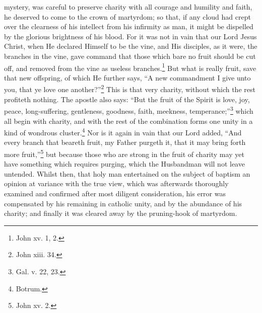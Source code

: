 mystery, was careful to preserve charity with all courage and humility and faith, he deserved to come to the crown of martyrdom; so that, if any cloud had crept over the clearness of his intellect from his infirmity as man, it might be dispelled by the glorious brightness of his blood. For it was not in vain that our Lord Jesus Christ, when He declared Himself to be the vine, and His disciples, as it were, the branches in the vine, gave command that those which bare no fruit should be cut off, and removed from the vine as useless branches.\footnote{\par  John xv. 1, 2.} But what is really fruit, save that new offspring, of which He further says, ``A new commandment I give unto you, that ye love one another?''\footnote{\par  John xiii. 34.} This is that very charity, without which the rest profiteth nothing. The apostle also says: ``But the fruit of the Spirit is love, joy, peace, long-suffering, gentleness, goodness, faith, meekness, temperance;''\footnote{\par  Gal. v. 22, 23.} which all begin with charity, and with the rest of the combination forms one unity in a kind of wondrous cluster.\footnote{\par  Botrum.} Nor is it again in vain that our Lord added, ``And every branch that beareth fruit, my Father purgeth it, that it may bring forth more fruit,''\footnote{\par  John xv. 2.} but because those who are strong in the fruit of charity may yet have something which requires purging, which the Husbandman will not leave untended. Whilst then, that holy man entertained on the subject of baptism an opinion at variance with the true view, which was afterwards thoroughly examined and confirmed after most diligent consideration, his error was compensated by his remaining in catholic unity, and by the abundance of his charity; and finally it was cleared away by the pruning-hook of martyrdom.


